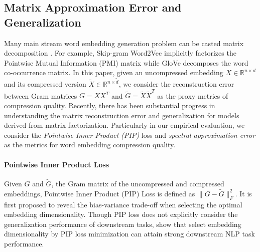 \subsection{Matrix Approximation Error and Generalization}
Many main stream word embedding generation problem can be casted matrix decomposition \citep{levy2014neural}. For example, Skip-gram Word2Vec \citep{word2vec13} implicitly factorizes the Pointwise Mutual Information (PMI) matrix while GloVe \citep{glove14} decomposes the word co-occurrence matrix. In this paper, given an uncompressed embedding $X\in\mathbb{R}^{n\times d}$ and its compressed version $\tilde{X}\in\mathbb{R}^{n\times \tilde{d}}$, we consider the reconstruction error between Gram matrices $G = XX^T$ and $\tilde{G} = \tilde{X}\tilde{X}^T$ as the proxy metrics of compression quality. Recently, there has been substantial progress in understanding the matrix reconstruction error and generalization for models derived from matrix factorization. Particularly in our empirical evaluation, we consider the \emph{Pointwise Inner Product (PIP)} loss \citep{yin18} and \emph{spectral approximation error} \citep{avron17,lprff18} as the metrics for word embedding compression quality. 

\paragraph{Pointwise Inner Product Loss}
Given $G$ and $\tilde{G}$, the Gram matrix of the uncompressed and compressed embeddings, Pointwise Inner Product (PIP) Loss is defined as $\|G - \tilde{G}\|_F^2$. It is first proposed to reveal the bias-variance trade-off when selecting the optimal embedding dimensionality. Though PIP loss does not explicitly consider the generalization performance of downstream tasks,  \citet{yin18} show that select embedding dimensionality by PIP loss minimization can attain strong downstream NLP task performance.



